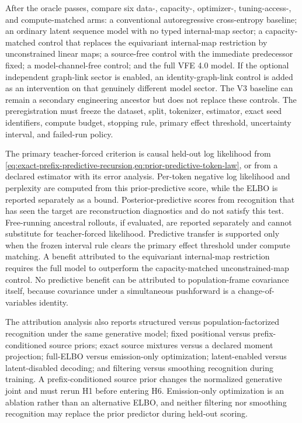 After the oracle passes, compare six data-, capacity-, optimizer-, tuning-access-, and compute-matched arms: a conventional autoregressive cross-entropy baseline; an ordinary latent sequence model with no typed internal-map sector; a capacity-matched control that replaces the equivariant internal-map restriction by unconstrained linear maps; a source-free control with the immediate predecessor fixed; a model-channel-free control; and the full VFE 4.0 model. If the optional independent graph-link sector is enabled, an identity-graph-link control is added as an intervention on that genuinely different model sector. The V3 baseline can remain a secondary engineering ancestor but does not replace these controls. The preregistration must freeze the dataset, split, tokenizer, estimator, exact seed identifiers, compute budget, stopping rule, primary effect threshold, uncertainty interval, and failed-run policy.

The primary teacher-forced criterion is causal held-out log likelihood from \cref{eq:exact-prefix-predictive-recursion,eq:prior-predictive-token-law}, or from a declared estimator with its error analysis. Per-token negative log likelihood and perplexity are computed from this prior-predictive score, while the ELBO is reported separately as a bound. Posterior-predictive scores from recognition that has seen the target are reconstruction diagnostics and do not satisfy this test. Free-running ancestral rollouts, if evaluated, are reported separately and cannot substitute for teacher-forced likelihood. Predictive transfer is supported only when the frozen interval rule clears the primary effect threshold under compute matching. A benefit attributed to the equivariant internal-map restriction requires the full model to outperform the capacity-matched unconstrained-map control. No predictive benefit can be attributed to population-frame covariance itself, because covariance under a simultaneous pushforward is a change-of-variables identity.

The attribution analysis also reports structured versus population-factorized recognition under the same generative model; fixed positional versus prefix-conditioned source priors; exact source mixtures versus a declared moment projection; full-ELBO versus emission-only optimization; latent-enabled versus latent-disabled decoding; and filtering versus smoothing recognition during training. A prefix-conditioned source prior changes the normalized generative joint and must rerun H1 before entering H6. Emission-only optimization is an ablation rather than an alternative ELBO, and neither filtering nor smoothing recognition may replace the prior predictor during held-out scoring.

